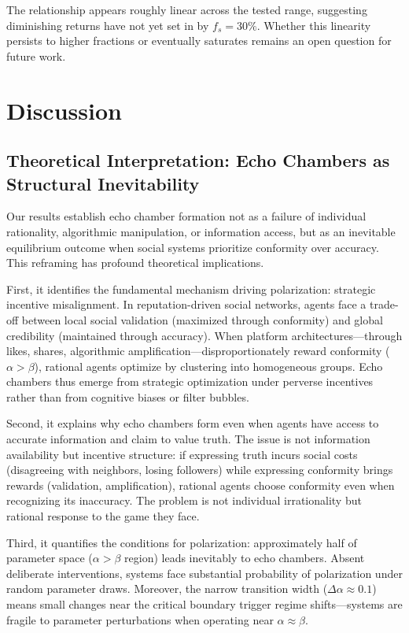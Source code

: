 \documentclass[11pt,a4paper]{article}
\begin{document}
The relationship appears roughly linear across the tested range, suggesting diminishing returns have not yet set in by $f_s=30\%$. Whether this linearity persists to higher fractions or eventually saturates remains an open question for future work.

\section{Discussion}

\subsection{Theoretical Interpretation: Echo Chambers as Structural Inevitability}

Our results establish echo chamber formation not as a failure of individual rationality, algorithmic manipulation, or information access, but as an inevitable equilibrium outcome when social systems prioritize conformity over accuracy. This reframing has profound theoretical implications.

First, it identifies the fundamental mechanism driving polarization: strategic incentive misalignment. In reputation-driven social networks, agents face a trade-off between local social validation (maximized through conformity) and global credibility (maintained through accuracy). When platform architectures—through likes, shares, algorithmic amplification—disproportionately reward conformity ($\alpha > \beta$), rational agents optimize by clustering into homogeneous groups. Echo chambers thus emerge from strategic optimization under perverse incentives rather than from cognitive biases or filter bubbles.

Second, it explains why echo chambers form even when agents have access to accurate information and claim to value truth. The issue is not information availability but incentive structure: if expressing truth incurs social costs (disagreeing with neighbors, losing followers) while expressing conformity brings rewards (validation, amplification), rational agents choose conformity even when recognizing its inaccuracy. The problem is not individual irrationality but rational response to the game they face.

Third, it quantifies the conditions for polarization: approximately half of parameter space ($\alpha > \beta$ region) leads inevitably to echo chambers. Absent deliberate interventions, systems face substantial probability of polarization under random parameter draws. Moreover, the narrow transition width ($\Delta\alpha \approx 0.1$) means small changes near the critical boundary trigger regime shifts—systems are fragile to parameter perturbations when operating near $\alpha \approx \beta$.
\end{document}
